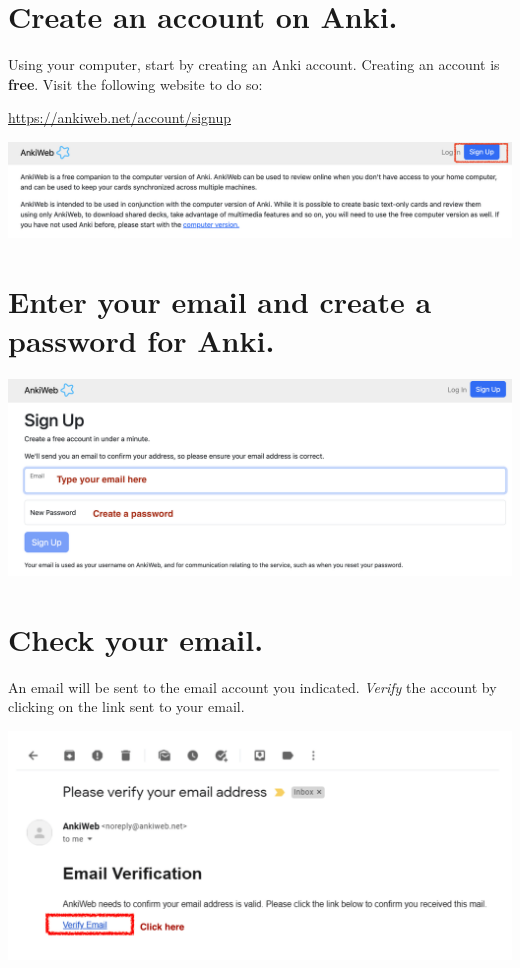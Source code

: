 \documentclass[
]{book}
\begin{document}
\hypertarget{create-an-account-on-anki.}{%
\section{Create an account on Anki.}\label{create-an-account-on-anki.}}

Using your computer, start by creating an Anki account. Creating an account is \textbf{free}. Visit the following website to do so:

\url{https://ankiweb.net/account/signup}

\includegraphics[width=0.9\linewidth]{images/reposit_en/sign_up}

\hypertarget{cross_3}{%
\section{Enter your email and create a password for Anki.}\label{cross_3}}

\includegraphics[width=0.9\linewidth]{images/reposit_en/email_password}

\hypertarget{check-your-email.}{%
\section{Check your email.}\label{check-your-email.}}

An email will be sent to the email account you indicated. \emph{Verify} the account by clicking on the link sent to your email.

\includegraphics[width=0.9\linewidth]{images/reposit_en/email_verification}
\end{document}
